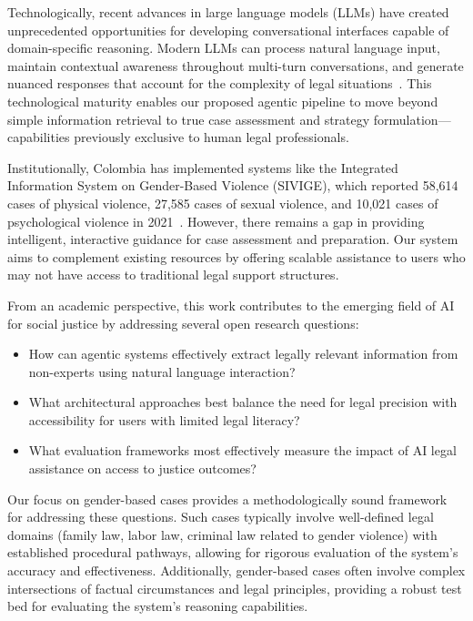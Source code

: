 Technologically, recent advances in large language models (LLMs) 
have created unprecedented opportunities for developing conversational 
interfaces capable of domain-specific reasoning. Modern LLMs can 
process natural language input, maintain contextual awareness 
throughout multi-turn conversations, and generate nuanced 
responses that account for the complexity of legal 
situations~\cite{darrow2023}. This technological maturity 
enables our proposed agentic pipeline to move beyond simple 
information retrieval to true case assessment and strategy 
formulation—capabilities previously exclusive to human legal 
professionals.

Institutionally, Colombia has implemented systems like the 
Integrated Information System on Gender-Based Violence (SIVIGE), 
which reported 58,614 cases of physical violence, 27,585 cases of 
sexual violence, and 10,021 cases of psychological violence in 
2021~\cite{advocates2023}. However, there remains a gap in 
providing intelligent, interactive guidance for case assessment 
and preparation. Our system aims to complement existing resources 
by offering scalable assistance to users who may not have access 
to traditional legal support structures.

From an academic perspective, this work contributes to the 
emerging field of AI for social justice by addressing several 
open research questions:

\begin{itemize}
\item How can agentic systems effectively extract legally relevant information from non-experts using natural language interaction?
\item What architectural approaches best balance the need for legal precision with accessibility for users with limited legal literacy?
\item What evaluation frameworks most effectively measure the impact of AI legal assistance on access to justice outcomes?
\end{itemize}

Our focus on gender-based cases provides a methodologically sound 
framework for addressing these questions. Such cases typically 
involve well-defined legal domains (family law, labor law, criminal 
law related to gender violence) with established procedural 
pathways, allowing for rigorous evaluation of the system’s 
accuracy and effectiveness. Additionally, gender-based cases 
often involve complex intersections of factual circumstances 
and legal principles, providing a robust test bed for evaluating 
the system’s reasoning capabilities.

